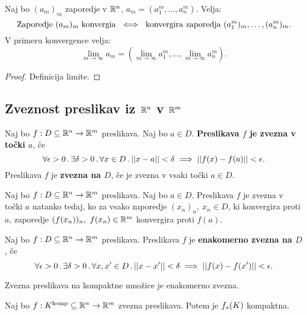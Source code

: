 \begin{trditev}
    Naj bo $(a_m)_m$ zaporedje v $\mathbb{R}^n$, $a_m = (a_1^m, \ldots, a_n^m)$. Velja:
    $$\text{Zaporedje } (a_m)_m \text{ konvergia } \iff \text{ konvergira zaporedja } (a_1^m)_m, \ldots, (a_n^m)_m.$$
    V primeru konvergence velja:
    $$\lim_{m \to \infty} a_m = (\lim_{m \to \infty} a_1^m, \ldots, \lim_{m \to \infty} a_n^m).$$
\end{trditev}

\begin{proof}
    Definicija limite.
\end{proof}

\newpage
\subsection{Zveznost preslikav iz $\mathbb{R}^n$ v $\mathbb{R}^m$}
\begin{definicija}
    Naj bo $f: D \subseteq \mathbb{R}^n \to \mathbb{R}^m$ preslikava. Naj bo $a \in D$. \textbf{Preslikava $f$ je zvezna v točki $a$}, če 
    $$\forall \epsilon > 0 \,.\, \exists \delta >0 \,.\, \forall x \in D \,.\, ||x-a|| < \delta \implies ||f(x)- f(a)|| < \epsilon.$$
    Preslikava $f$ je \textbf{zvezna na $D$}, če je zvezna v vsaki točki $a \in D$.
\end{definicija}

\begin{trditev}
    Naj bo $f: D \subseteq \mathbb{R}^n \to \mathbb{R}^m$ preslikava. Naj bo $a \in D$. Preslikava $f$ je zvezna v točki $a$ natanko tedaj, ko za vsako zaporedje $(x_n)_n, \ x_n \in D$, ki konvergira proti $a$, zaporedje $(f(x_n))_n, \ f(x_n) \in \mathbb{R}^m$ konvergira proti $f(a)$.
\end{trditev}

\begin{definicija}
    Naj bo $f: D \subseteq \mathbb{R}^n \to \mathbb{R}^m$ preslikava. Preslikava $f$ je \textbf{enakomerno zvezna na $D$}, če
    $$\forall \epsilon > 0 \,.\, \exists \delta > 0 \,.\, \forall x, x' \in D \,.\, ||x - x'|| < \delta \implies ||f(x) - f(x')|| < \epsilon.$$
\end{definicija}

\begin{trditev}
    Zvezna preslikava na kompaktne množice je enakomerno zvezna.
\end{trditev}

\begin{trditev}
    Naj bo $f: K^\text{komp} \subseteq \mathbb{R}^n \to \mathbb{R}^m$ zvezna preslikava. Potem je $f_{*}(K)$ kompaktna.
\end{trditev}

